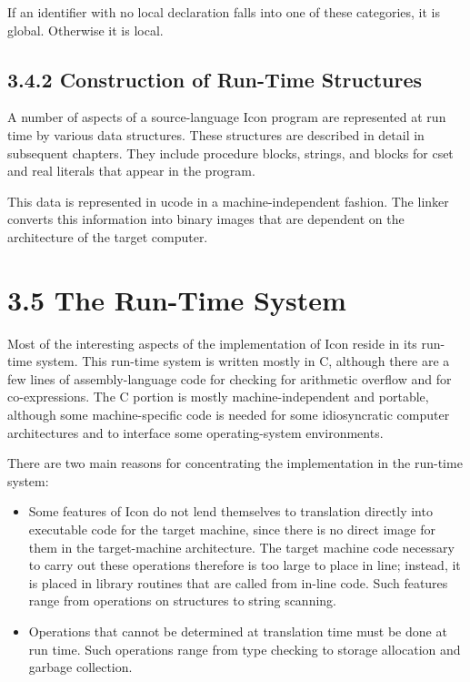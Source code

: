 If an identifier with no local declaration falls into one of these
categories, it is global. Otherwise it is local.

\subsection[3.4.2 Construction of Run-Time Structures]{3.4.2 Construction of Run-Time Structures}

A number of aspects of a source-language Icon program are represented
at run time by various data structures. These structures are described
in detail in subsequent chapters. They include procedure blocks,
strings, and blocks for cset and real literals that appear in the
program.


This data is represented in ucode in a machine-independent
fashion. The linker converts this information into binary images that
are dependent on the architecture of the target computer.

\section[3.5 The Run{}-Time System]{3.5 The Run-Time System}

Most of the interesting aspects of the implementation of Icon reside
in its run-time system. This run-time system is written mostly in C,
although there are a few lines of assembly-language code for checking
for arithmetic overflow and for co-expressions. The C portion is
mostly machine-independent and portable, although some
machine-specific code is needed for some idiosyncratic computer
architectures and to interface some operating-system environments.

There are two main reasons for concentrating the implementation in the
run-time system:

\liststyleLiii
\begin{itemize}

\item Some features of Icon do not lend themselves to translation
directly into executable code for the target machine, since there is
no direct image for them in the target-machine architecture. The
target machine code necessary to carry out these operations therefore
is too large to place in line; instead, it is placed in library
routines that are called from in-line code. Such features range from
operations on structures to string scanning.

\item Operations that cannot be determined at translation time must be
done at run time. Such operations range from type checking to storage
allocation and garbage collection.

\end{itemize}

